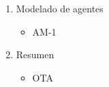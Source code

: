 \documentclass{article}
\begin{document}
\begin{enumerate}
\begin{enumerate}
\begin{enumerate}
                        \item TM-1 Descripcion interna y externa de la tarea
                        \item TM-2 descripcion de los items de conocimiento
                    \end{enumerate}
                \item Modelado de agentes
                    \begin{itemize}
                        \item AM-1
                    \end{itemize}
                \item Resumen
                    \begin{itemize}
                        \item OTA
                    \end{itemize}
                
            \end{enumerate}
    \end{enumerate}
\end{document}

